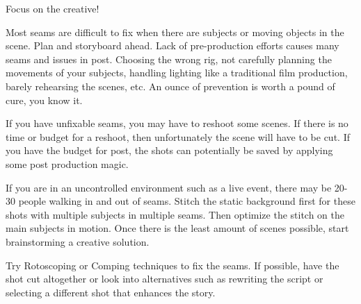 \begin{fullwidth}

{\large Focus on the creative! \par}

Most seams are difficult to fix when there are subjects or moving objects in the scene. Plan and storyboard ahead. Lack of pre-production efforts causes many seams and issues in post. Choosing the wrong rig, not carefully planning the movements of your subjects, handling lighting like a traditional film production, barely rehearsing the scenes, etc. An ounce of prevention is worth a pound of cure, you know it. 

If you have unfixable seams, you may have to reshoot some scenes. If there is no time or budget for a reshoot, then unfortunately the scene will have to be cut. If you have the budget for post, the shots can potentially be saved by applying some post production magic. 

If you are in an uncontrolled environment such as a live event, there may be 20-30 people walking in and out of seams. Stitch the static background first for these shots with multiple subjects in multiple seams. Then optimize the stitch on the main subjects in motion. Once there is the least amount of scenes possible, start brainstorming a creative solution. 




Try Rotoscoping or Comping techniques to fix the seams. If possible, have the shot cut altogether or look into alternatives such as rewriting the script or selecting a different shot that enhances the story.

\clearpage
\end{fullwidth}